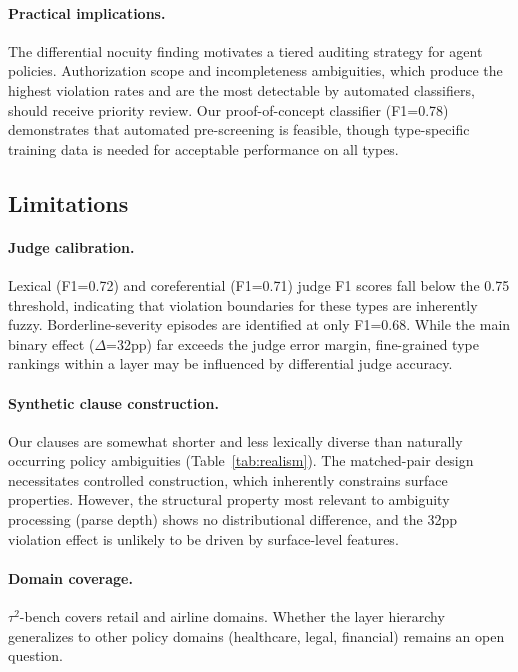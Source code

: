 \documentclass[11pt]{article}
\begin{document}
\paragraph{Practical implications.}
The differential nocuity finding motivates a tiered auditing strategy for agent policies. Authorization scope and incompleteness ambiguities, which produce the highest violation rates and are the most detectable by automated classifiers, should receive priority review. Our proof-of-concept classifier (F1=0.78) demonstrates that automated pre-screening is feasible, though type-specific training data is needed for acceptable performance on all types.

\subsection{Limitations}

\paragraph{Judge calibration.}
Lexical (F1=0.72) and coreferential (F1=0.71) judge F1 scores fall below the 0.75 threshold, indicating that violation boundaries for these types are inherently fuzzy. Borderline-severity episodes are identified at only F1=0.68. While the main binary effect ($\Delta$=32pp) far exceeds the judge error margin, fine-grained type rankings within a layer may be influenced by differential judge accuracy.

\paragraph{Synthetic clause construction.}
Our clauses are somewhat shorter and less lexically diverse than naturally occurring policy ambiguities (Table~\ref{tab:realism}). The matched-pair design necessitates controlled construction, which inherently constrains surface properties. However, the structural property most relevant to ambiguity processing (parse depth) shows no distributional difference, and the 32pp violation effect is unlikely to be driven by surface-level features.

\paragraph{Domain coverage.}
$\tau^2$-bench covers retail and airline domains. Whether the layer hierarchy generalizes to other policy domains (healthcare, legal, financial) remains an open question.
\end{document}
